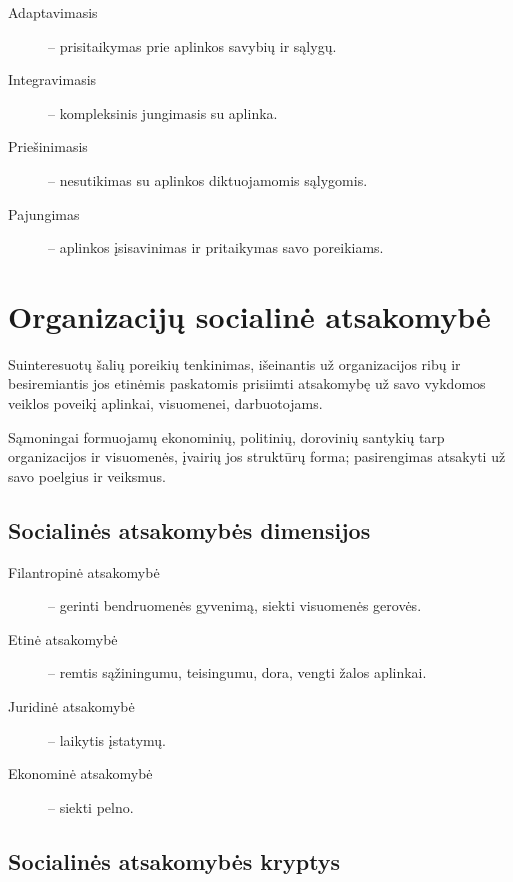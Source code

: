 \begin{description}
  \item[Adaptavimasis] – prisitaikymas prie aplinkos savybių ir sąlygų.
  \item[Integravimasis] – kompleksinis jungimasis su aplinka.
  \item[Priešinimasis] – nesutikimas su aplinkos diktuojamomis sąlygomis.
  \item[Pajungimas] – aplinkos įsisavinimas ir pritaikymas savo poreikiams.
\end{description}

\chapter{Organizacijų socialinė atsakomybė}

\begin{defn}
  Suinteresuotų šalių poreikių tenkinimas, išeinantis už organizacijos
  ribų ir besiremiantis jos etinėmis paskatomis prisiimti atsakomybę
  už savo vykdomos veiklos poveikį aplinkai, visuomenei, darbuotojams.
\end{defn}

\begin{defn}
  Sąmoningai formuojamų ekonominių, politinių, dorovinių santykių
  tarp organizacijos ir visuomenės, įvairių jos struktūrų forma;
  pasirengimas atsakyti už savo poelgius ir veiksmus.
\end{defn}

\section{Socialinės atsakomybės dimensijos}

\begin{description}
  \item[Filantropinė atsakomybė] – gerinti bendruomenės gyvenimą, siekti
    visuomenės gerovės.
  \item[Etinė atsakomybė] – remtis sąžiningumu, teisingumu, dora, vengti
    žalos aplinkai.
  \item[Juridinė atsakomybė] – laikytis įstatymų.
  \item[Ekonominė atsakomybė] – siekti pelno.
\end{description}

\section{Socialinės atsakomybės kryptys}

